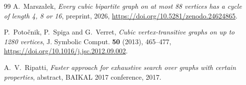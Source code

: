 \documentclass[11pt]{amsart}
\theoremstyle{remark}
\begin{document}
\begin{thebibliography}{99}
A.~Marszałek, \emph{Every cubic bipartite graph on at most 88 vertices has a
cycle of length 4, 8 or 16}, preprint, 2026,
\url{https://doi.org/10.5281/zenodo.24624865}.

P.~Potočnik, P.~Spiga and G.~Verret, \emph{Cubic vertex-transitive graphs on up
to 1280 vertices}, J. Symbolic Comput. \textbf{50} (2013), 465--477,
\url{https://doi.org/10.1016/j.jsc.2012.09.002}.

A.~V.~Ripatti, \emph{Faster approach for exhaustive search over graphs with
certain properties}, abstract, BAIKAL 2017 conference, 2017.

\end{thebibliography}
\end{document}
